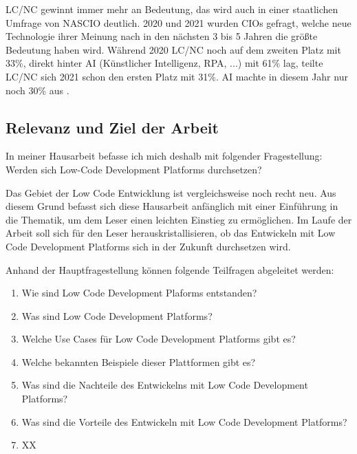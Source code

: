 \documentclass[12pt]{article} %
\begin{document}
	LC/NC gewinnt immer mehr an Bedeutung, das wird auch in einer staatlichen Umfrage von NASCIO deutlich. 2020 und 2021 wurden CIOs gefragt, welche neue Technologie ihrer Meinung nach in den nächsten 3 bis 5 Jahren die größte Bedeutung haben wird. Während 2020 LC/NC noch auf dem zweiten Platz mit 33\%, direkt hinter AI (Künstlicher Intelligenz, RPA, ...) mit 61\% lag, teilte LC/NC sich 2021 schon den ersten Platz mit 31\%. AI machte in diesem Jahr nur noch 30\% aus \cite{AmyGlasscock.2021}.
	
	
	\subsection{Relevanz und Ziel der Arbeit}	
	In meiner Hausarbeit befasse ich mich deshalb mit folgender Fragestellung:\newline
			Werden sich Low-Code Development Platforms durchsetzen? \newline
			
	Das Gebiet der Low Code Entwicklung ist vergleichsweise noch recht neu. Aus diesem Grund befasst sich diese Hausarbeit anfänglich mit einer Einführung in die Thematik, um dem Leser einen leichten Einstieg zu ermöglichen. Im Laufe der Arbeit soll sich für den Leser herauskristallisieren, ob das Entwickeln mit Low Code Development Platforms sich in der Zukunft durchsetzen wird. \newline
	
	Anhand der Hauptfragestellung können folgende Teilfragen abgeleitet werden:
	
	\begin{enumerate}[label=(\roman*)]
		\item Wie sind Low Code Development Plaforms entstanden? \newline
		\item Was sind Low Code Development Platforms? \newline
		\item Welche Use Cases für Low Code Development Platforms gibt es? \newline
		\item Welche bekannten Beispiele dieser Plattformen gibt es? \newline
		\item Was sind die Nachteile des Entwickelns mit Low Code Development Platforms? \newline
		\item Was sind die Vorteile des Entwickeln mit Low Code Development Platforms? \newline
		\item XX %
	\end{enumerate}
	
\end{document}
